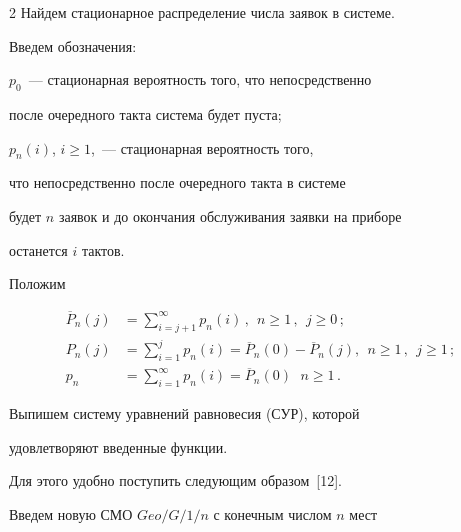 \begin{multicols}{2}
Найдем стационарное распределение числа заявок в системе.





Введем обозначения:





$p_{0}$~--- стационарная вероятность того, что непосредственно


после очередного такта система будет пуста;





$p_{n}(i)$,  $i\ge 1$,~--- стационарная вероятность того,


что непосредственно после очередного такта в сис\-те\-ме


будет $n$ заявок и до окончания обслуживания заявки на приборе


останется $i$ тактов.





Положим


\begin{align*}


\overline P_{n}(j) & =


\sum\limits_{i=j+1}^\infty


p_{n}(i)\,, \ \ n\ge 1\,,\ \ j\ge 0\,;


\\


P_{n}(j) & = \sum\limits_{i=1}^j


p_{n}(i)     =


\overline P_{n}(0) - \overline P_{n}(j),


\ \ n\ge 1\,,\ \ j\ge 1\,;


\\


p_{n} &=


\sum\limits_{i=1}^\infty


p_{n}(i) = \overline P_{n}(0)\,


\ \ n\ge 1\,.


\end{align*}





Выпишем систему уравнений равновесия (СУР), которой


удовлетворяют введенные функции.


Для этого удобно поступить следующим образом~[12].


Введем новую СМО $Geo/G/1/n$ с конечным числом $n$ мест



\end{multicols}
